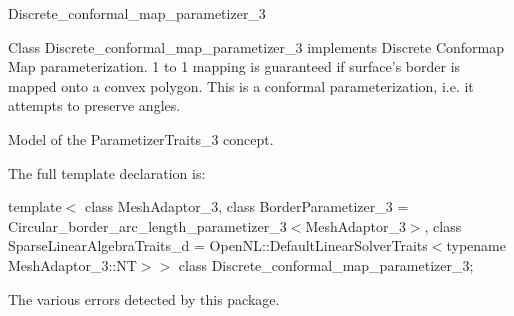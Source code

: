 

\begin{ccRefClass}{Discrete_conformal_map_parametizer_3}  %


\ccDefinition


Class Discrete\_conformal\_map\_parametizer\_3 implements Discrete Conformap Map parameterization. 1 to 1 mapping is guaranteed if surface's border is mapped onto a convex polygon. This is a conformal parameterization, i.e. it attempts to preserve angles.



\ccIsModel

Model of the ParametizerTraits\_3 concept.



\ccParameters

The full template declaration is:

template$<$
class MeshAdaptor\_3, 
class BorderParametizer\_3 = Circular\_border\_arc\_length\_parametizer\_3$<$MeshAdaptor\_3$>$, 
class SparseLinearAlgebraTraits\_d = OpenNL::DefaultLinearSolverTraits$<$typename MeshAdaptor\_3::NT$>$$>$ 
class Discrete\_conformal\_map\_parametizer\_3;


\ccTypes


{
}
{
The various errors detected by this package.
}
{
}
{
}
{
}
{
}
{
}
{
}
{
}
{
}
{
}
{
}
{
}
{
}
{
}
{
}
{
}
{
}
{
}
{
}
{
}
{
}
{
}
{
}
{
}
{
}



\end{ccRefClass}
